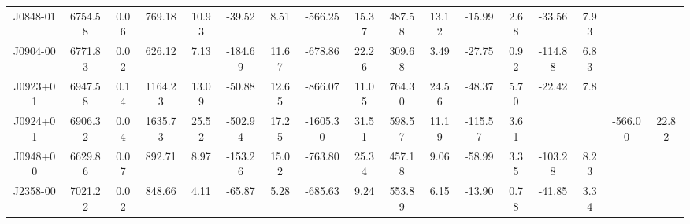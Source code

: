 \begin{table}
\begin{tabular}{ccccccccccccccccc}
J0848-01 & 6754.58 & 0.06 & 769.18 & 10.93 & -39.52 & 8.51 & -566.25 & 15.37 & 487.58 & 13.12 & -15.99 & 2.68 & -33.56 & 7.93 &  &  \\
J0904-00 & 6771.83 & 0.02 & 626.12 & 7.13 & -184.69 & 11.67 & -678.86 & 22.26 & 309.68 & 3.49 & -27.75 & 0.92 & -114.88 & 6.83 &  &  \\
J0923+01 & 6947.58 & 0.14 & 1164.23 & 13.09 & -50.88 & 12.65 & -866.07 & 11.05 & 764.30 & 24.56 & -48.37 & 5.70 & -22.42 & 7.8 &  &  \\
J0924+01 & 6906.32 & 0.04 & 1635.73 & 25.52 & -502.94 & 17.25 & -1605.30 & 31.51 & 598.57 & 11.19 & -115.57 & 3.61 &  &  & -566.00 & 22.82 \\
J0948+00 & 6629.86 & 0.07 & 892.71 & 8.97 & -153.26 & 15.02 & -763.80 & 25.34 & 457.18 & 9.06 & -58.99 & 3.35 & -103.28 & 8.23 &  &  \\
J2358-00 & 7021.22 & 0.02 & 848.66 & 4.11 & -65.87 & 5.28 & -685.63 & 9.24 & 553.89 & 6.15 & -13.90 & 0.78 & -41.85 & 3.34 &  &  \\
\end{tabular}
\end{table}
